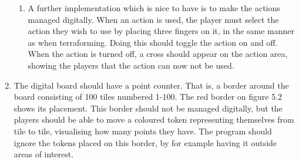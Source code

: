 \begin{enumerate}
	\begin{enumerate}
	\item A further implementation which is nice to have is to make the actions managed digitally. When an action is used, the player must select the action they wish to use by placing three fingers on it, in the same manner as when terraforming. Doing this should toggle the action on and off. When the action is turned off, a cross should appear on the action area, showing the players that the action can now not be used.
	\end{enumerate}
\item The digital board should have a point counter. That is, a border around the board consisting of 100 tiles numbered 1-100. The red border on figure 5.2 shows its placement. This border should not be managed digitally, but the players should be able to move a coloured token representing themselves from tile to tile, visualising how many points they have. The program should ignore the tokens placed on this border, by for example having it outside areas of interest. 
\end{enumerate}